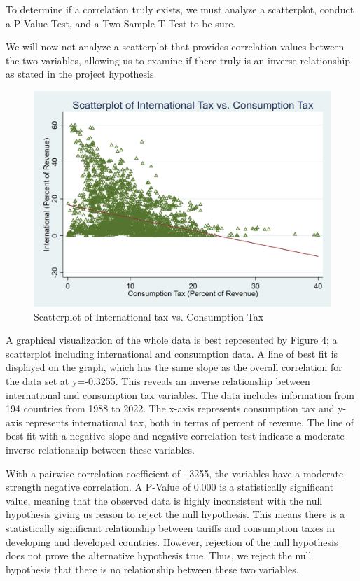 \documentclass[12pt]{article}
\begin{document}
To determine if a correlation truly exists, we must analyze a scatterplot, conduct a P-Value Test, and a Two-Sample T-Test to be sure. 

We will now not analyze a scatterplot that provides correlation values between the two variables, allowing us to examine if there truly is an inverse relationship as stated in the project hypothesis. 

\begin{figure}[H]
    \centering
    \includegraphics[width=0.8\linewidth]{Reproducibility_Package//research_outputs/Scatterplotintvscons.png}
    \caption{Scatterplot of International tax vs. Consumption Tax}
    \label{fig:enter-label}
\end{figure}

A graphical visualization of the whole data is best represented by Figure 4; a scatterplot including international and consumption data. A line of best fit is displayed on the graph, which has the same slope as the overall correlation for the data set at y=-0.3255. This reveals an inverse relationship between international and consumption tax variables. The data includes information from 194 countries from 1988 to 2022. The x-axis represents consumption tax and y-axis represents international tax, both in terms of percent of revenue. The line of best fit with a negative slope and negative correlation test indicate a moderate inverse relationship between these variables. 

With a pairwise correlation coefficient  of -.3255, the variables have a moderate strength negative correlation. A P-Value of 0.000 is a statistically significant value, meaning that the observed data is highly inconsistent with the null hypothesis giving us reason to reject the null hypothesis. This means there is a statistically significant relationship between tariffs and consumption taxes in developing and developed countries. However, rejection of the null hypothesis does not prove the alternative hypothesis true. Thus, we reject the null hypothesis that there is no relationship between these two variables. 
\end{document}
